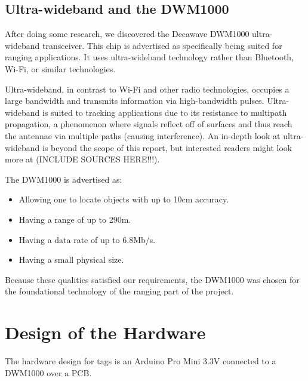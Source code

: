 \subsection{Ultra-wideband and the DWM1000}
After doing some research, we discovered the Decawave DWM1000 ultra-wideband transceiver. This chip is advertised as specifically being suited for ranging applications. It uses ultra-wideband technology rather than Bluetooth, Wi-Fi, or similar technologies.

Ultra-wideband, in contrast to Wi-Fi and other radio technologies, occupies a large bandwidth and transmits information via high-bandwidth pulses. Ultra-wideband is suited to tracking applications due to its resistance to multipath propagation, a phenomenon where signals reflect off of surfaces and thus reach the antennae via multiple paths (causing interference). An in-depth look at ultra-wideband is beyond the scope of this report, but interested readers might look more at (INCLUDE SOURCES HERE!!!).

The DWM1000 is advertised as:
\begin{itemize}
	\item Allowing one to locate objects with up to 10cm accuracy.
	\item Having a range of up to 290m.
	\item Having a data rate of up to 6.8Mb/s.
	\item Having a small physical size. 
\end{itemize}

Because these qualities satisfied our requirements, the DWM1000 was chosen for the foundational technology of the ranging part of the project. 

\section{Design of the Hardware}
The hardware design for tags is an Arduino Pro Mini 3.3V connected to a DWM1000 over a PCB. 


